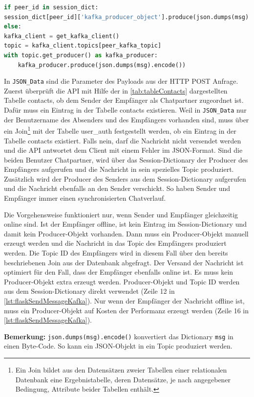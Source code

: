 \documentclass[a4paper,titlepage,halfparskip,12pt]{scrreprt}
\begin{document}
\begin{onehalfspacing}
\begin{lstlisting}[language=python, caption={Code für den Versand einer Nachricht über die \acs{API} an Apache Kafka}, label={lst:flaskSendMessageKafka}]
if peer_id in session_dict:
session_dict[peer_id]['kafka_producer_object'].produce(json.dumps(msg).encode())
else:
kafka_client = get_kafka_client()
topic = kafka_client.topics[peer_kafka_topic]
with topic.get_producer() as kafka_producer:
    kafka_producer.produce(json.dumps(msg).encode())
\end{lstlisting}

In \texttt{JSON\_Data} sind die Parameter des Payloads aus der \acs{HTTP} POST Anfrage.
Zuerst überprüft die \acs{API} mit Hilfe der in \autoref{tab:tableContacts} dargestellten Tabelle contacts, ob dem Sender der Empfänger als Chatpartner zugeordnet ist. Dafür muss ein Eintrag in der Tabelle contacts existieren. Weil in \texttt{JSON\_Data} nur der Benutzername des Absenders und des Empfängers vorhanden sind, muss über ein Join\footnote{Ein Join bildet aus den Datensätzen zweier Tabellen einer relationalen Datenbank eine Ergebnistabelle, deren Datensätze, je nach angegebener Bedingung, Attribute beider Tabellen enthält.\cite{Schubert2007}} mit der Tabelle user\_auth festgestellt werden, ob ein Eintrag in der Tabelle contacts existiert. Falls nein, darf die Nachricht nicht versendet werden und die \acs{API} antwortet dem Client mit einem Fehler im \acs{JSON}-Format. Sind die beiden Benutzer Chatpartner, wird über das Session-Dictionary der Producer des Empfängers aufgerufen und die Nachricht in sein spezielles Topic produziert. Zusätzlich wird der Producer des Senders aus dem Session-Dictionary aufgerufen und die Nachricht ebenfalls an den Sender verschickt. So haben Sender und Empfänger immer einen synchronisierten Chatverlauf.

Die Vorgehensweise funktioniert nur, wenn Sender und Empfänger gleichzeitig online sind. Ist der Empfänger offline, ist kein Eintrag im Session-Dictionary und damit kein Producer-Objekt vorhanden. Dann muss ein Producer-Objekt manuell erzeugt werden und die Nachricht in das Topic des Empfängers produziert werden. Die Topic ID des Empfängers wird in diesem Fall über den bereits beschriebenen Join aus der Datenbank abgefragt. Der Versand der Nachricht ist optimiert für den Fall, dass der Empfänger ebenfalls online ist. Es muss kein Producer-Objekt extra erzeugt werden. Producer-Objekt und Topic ID werden aus dem Session-Dictionary direkt verwendet (Zeile 12 in \autoref{lst:flaskSendMessageKafka}). Nur wenn der Empfänger der Nachricht offline ist, muss ein Producer-Objekt auf Kosten der Performanz erzeugt werden (Zeile 16 in \autoref{lst:flaskSendMessageKafka}).

\textbf{Bemerkung:} \texttt{json.dumps(msg).encode()} konvertiert das Dictionary \texttt{msg} in einen Byte-Code. So kann ein \acs{JSON}-Objekt in ein Topic produziert werden.


\end{onehalfspacing}
\end{document}
